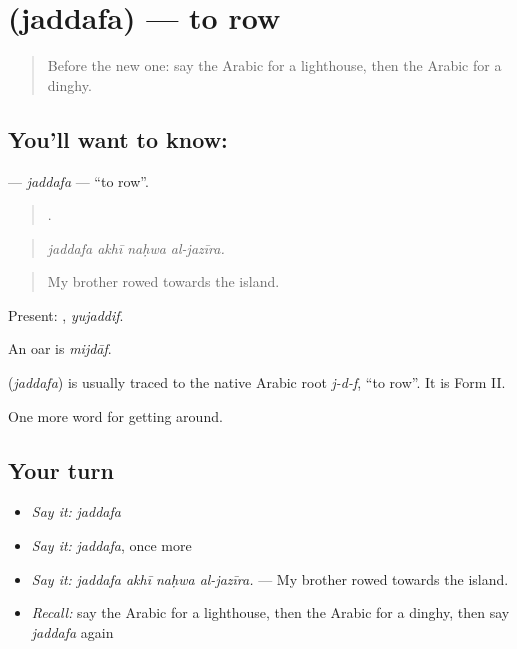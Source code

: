 \section[\texorpdfstring{\ar{جدف} (jaddafa)}{جدف (jaddafa)}]{ (jaddafa) — to row}

\label{lesson:AR-C430-jaddafa}



\begin{quote}
Before the new one: say the Arabic for a lighthouse, then the Arabic for a dinghy.
\end{quote}

\subsection*{You'll want to know: }
\textbf{} — \emph{jaddafa} — \textquotedblleft{}to row\textquotedblright{}.

\begin{quote}
   .
\end{quote}

\begin{quote}
\emph{jaddafa akhī naḥwa al-jazīra.}
\end{quote}

\begin{quote}
My brother rowed towards the island.
\end{quote}

Present: , \emph{yujaddif}.

An oar is \emph{mijdāf}.

\begin{cousinweb}
\textbf{} (\emph{jaddafa}) is usually traced to the native Arabic root \emph{j-d-f}, \textquotedblleft{}to row\textquotedblright{}. It is Form II.
\end{cousinweb}

\begin{grammarlens}[title={What you've built}]
One more word for getting around.
\end{grammarlens}

\subsection*{Your turn}
\begin{itemize}
\raggedright
  \item \emph{Say it:} \emph{jaddafa}
  \item \emph{Say it:} \emph{jaddafa}, once more
  \item \emph{Say it:} \emph{jaddafa akhī naḥwa al-jazīra.} — My brother rowed towards the island.
  \item \emph{Recall:} say the Arabic for a lighthouse, then the Arabic for a dinghy, then say \emph{jaddafa} again
\end{itemize}

